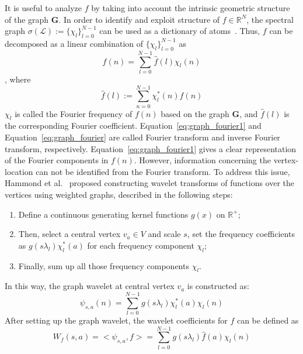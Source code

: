 It is useful to analyze $f$ by taking into account the intrinsic geometric structure of the graph $\mathbf{G}$. In order to identify and exploit structure of  $f\in \mathbb{R}^N$, the spectral graph $\sigma({\mathcal{L}}):=\{\chi_l\}_{l=0}^{N-1}$ can be used as a dictionary of atoms~\cite{shuman_ACHA_2013}. Thus, $f$ can be decomposed as a linear combination of $\{\chi_l\}_{l=0}^{N-1}$ as
\vspace{-0.5em}
\begin{equation}
\label{eq:graph_fourier}
f(n)= \sum\limits_{l=0}^{N-1}\hat{f}(l)\chi_l(n)
\end{equation}
\vspace{-0.5em}
, where
\vspace{-0.5em}
\begin{equation}
\label{eq:graph_fourier1}
\hat{f}(l):= \sum\limits_{n=0}^{N-1}\chi^*_l(n)f(n)
\end{equation}
$\chi_l$ is called the Fourier frequency of $f(n)$ based on the graph $\mathbf{G}$, and $\hat{f}(l)$ is the corresponding Fourier coefficient.
Equation~\ref{eq:graph_fourier1} and Equation~\ref{eq:graph_fourier} are called Fourier transform and inverse Fourier transform, respectively.
Equation~\ref{eq:graph_fourier1} gives a clear representation of the Fourier components in $f(n)$.
However, information concerning the vertex-location can not be identified from the Fourier transform. To address this issue, Hammond et al.~\cite{hammond2011wavelets} proposed constructing wavelet transforms of functions over the vertices using weighted graphs, described in the following steps:

\begin{enumerate}
\item Define a continuous generating kernel functions $g(x)$ on $\mathbb{R}^+$;
\item Then, select a central vertex $v_a \in {V}$ and scale $s$, set the frequency coefficients as $g(s\lambda_l)\chi^*_l(a)$ for each frequency component $\chi_l$;
\item Finally, sum up all those frequency components $\chi_l$.
\end{enumerate}
In this way, the graph wavelet at central vertex $v_a$ is constructed as:
\vspace{-0.5em}
\begin{equation}
\label{eq:graphwaveletdefinition}
\psi_{s,a}(n) = \sum\limits_{l=0}^{N-1}g(s\lambda_l)\chi_l^*(a)\chi_l(n)
\end{equation}
After setting up the graph wavelet, the wavelet coefficients for $f$ can be defined as
\vspace{-0.5em}
\begin{equation}
\label{eq:graph_graphwavelet}
W_f(s,a)=<\psi_{s,a}, f>=\sum\limits_{l=0}^{N-1}g(s\lambda_l)\hat{f}(a)\chi_l(n)
\end{equation}



